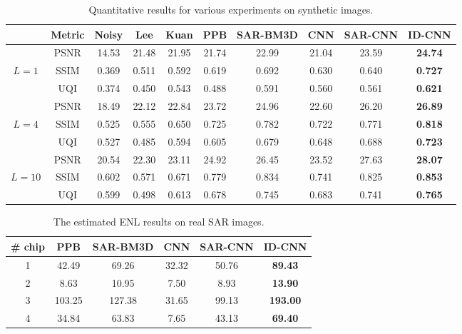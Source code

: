 \documentclass[journal]{IEEEtran}
\begin{document}
\begin{table*}[htp!]
	\renewcommand{\arraystretch}{1.3}
	\caption{Quantitative results for various experiments on synthetic images.}
	\label{tab:synthetic-result}
	\centering
	\begin{tabular}{c|c|c|c|c|c|c|c|c|c}
		\hline
		\hline
		&Metric  &  Noisy & Lee & Kuan & PPB & SAR-BM3D & CNN & SAR-CNN &ID-CNN \\
		\hline
		
		&PSNR   &  14.53 & 21.48 & 21.95 & 21.74 & 22.99 & 21.04 & 23.59 & \textbf{24.74}\\
		
		$L=1$&SSIM    &  0.369 & 0.511 & 0.592 & 0.619 & 0.692 & 0.630 & 0.640 & \textbf{0.727}\\
		
		&UQI       & 0.374 & 0.450 & 0.543 & 0.488 & 0.591 & 0.560 & 0.561 & \textbf{0.621}\\
		\hline
		&PSNR   &  18.49 & 22.12 & 22.84 & 23.72 & 24.96 & 22.60 & 26.20 & \textbf{26.89}\\
		
		$L=4$&SSIM& 0.525 & 0.555 & 0.650 & 0.725 & 0.782 & 0.722 & 0.771 & \textbf{0.818}\\
		
		&UQI    & 0.527 & 0.485 & 0.594 & 0.605 & 0.679 & 0.648 & 0.688 & \textbf{0.723}\\
		\hline
		&PSNR   &  20.54 & 22.30 & 23.11 & 24.92 & 26.45 & 23.52 & 27.63 & \textbf{28.07}\\
		
		$L=10$&SSIM&0.602 & 0.571 & 0.671 & 0.779 & 0.834 & 0.741 & 0.825 & \textbf{0.853}\\
		
		&UQI    & 0.599 & 0.498 & 0.613 & 0.678 & 0.745 & 0.683 & 0.741 & \textbf{0.765}\\
		\hline
		\hline
	\end{tabular}
\end{table*}





\begin{table}[htp!]
	\renewcommand{\arraystretch}{1.3}
	\caption{The estimated ENL results on real SAR images.}
	\label{tab:real-result}
	\centering
	\begin{tabular}{c|c|c|c|c|c}
		\hline
		\hline
		\# chip & PPB & SAR-BM3D & CNN & SAR-CNN & ID-CNN \\
		\hline
		
		1 & 42.49 & 69.26 & 32.32 & 50.76 & \textbf{89.43}\\
		
		2 & 8.63 & 10.95 & 7.50 & 8.93 & \textbf{13.90} \\
		
		3 & 103.25 & 127.38 & 31.65 & 99.13 & \textbf{193.00}\\
		
		4 & 34.84 & 63.83 & 7.65 & 43.13 & \textbf{69.40} \\
		
		
		\hline
		\hline
	\end{tabular}
\end{table}
\end{document}
